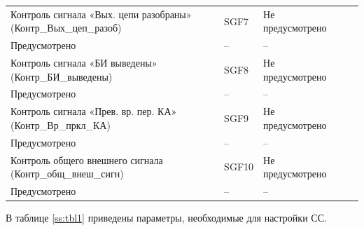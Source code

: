 \begin{longtable}{|>{\centering\arraybackslash}m{5.3cm}|>{\centering\arraybackslash}m{3.3cm}|>{\centering\arraybackslash}m{4.2cm}|>{\centering\arraybackslash}m{1.8cm}|>{\centering\arraybackslash}m{1cm}|}
\hline
\centering Контроль сигнала «Вых. цепи разобраны» (Контр\_Вых\_цеп\_разоб)  & \centering SGF7 & \centering Не предусмотрено \\ Предусмотрено & \centering -- & \centering \arraybackslash -- \\
\hline
\centering Контроль сигнала «БИ выведены» (Контр\_БИ\_выведены)  & \centering SGF8 & \centering Не предусмотрено \\ Предусмотрено & \centering -- & \centering \arraybackslash -- \\
\hline
\centering Контроль сигнала «Прев. вр. пер. КА» (Контр\_Вр\_пркл\_КА)  & \centering SGF9 & \centering Не предусмотрено \\ Предусмотрено & \centering -- & \centering \arraybackslash -- \\
\hline
\centering Контроль общего внешнего сигнала (Контр\_общ\_внеш\_сигн)  & \centering SGF10 & \centering Не предусмотрено \\ Предусмотрено & \centering -- & \centering \arraybackslash -- \\
\hline
\end{longtable}
\normalsize



\par
В таблице \ref{ss:tbl1} приведены параметры, необходимые для настройки СС. 

